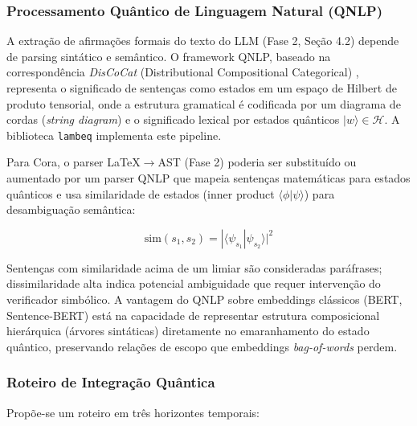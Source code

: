 \documentclass[5p]{elsarticle}
\theoremstyle{remark}
\begin{document}
\subsubsection{Processamento Quântico de Linguagem Natural (QNLP)}

A extração de afirmações formais do texto do LLM (Fase 2, Seção 4.2) depende de parsing sintático e semântico. O framework QNLP, baseado na correspondência \textit{DisCoCat} (Distributional Compositional Categorical) \cite{Coecke2010DisCoCat}, representa o significado de sentenças como estados em um espaço de Hilbert de produto tensorial, onde a estrutura gramatical é codificada por um diagrama de cordas (\textit{string diagram}) e o significado lexical por estados quânticos $|w\rangle \in \mathcal{H}$. A biblioteca \texttt{lambeq} \cite{Kartsaklis2021Lambeq} implementa este pipeline.

Para Cora, o parser LaTeX$\to$AST (Fase 2) poderia ser substituído ou aumentado por um parser QNLP que mapeia sentenças matemáticas para estados quânticos e usa similaridade de estados (inner product $\langle\phi|\psi\rangle$) para desambiguação semântica:

\begin{equation}
\text{sim}(s_1, s_2) = |\langle\psi_{s_1}|\psi_{s_2}\rangle|^2
\label{eq:qnlp_sim}
\end{equation}

Sentenças com similaridade acima de um limiar são consideradas paráfrases; dissimilaridade alta indica potencial ambiguidade que requer intervenção do verificador simbólico. A vantagem do QNLP sobre embeddings clássicos (BERT, Sentence-BERT) está na capacidade de representar estrutura composicional hierárquica (árvores sintáticas) diretamente no emaranhamento do estado quântico, preservando relações de escopo que embeddings \textit{bag-of-words} perdem.

\subsubsection{Roteiro de Integração Quântica}

Propõe-se um roteiro em três horizontes temporais:
\end{document}
